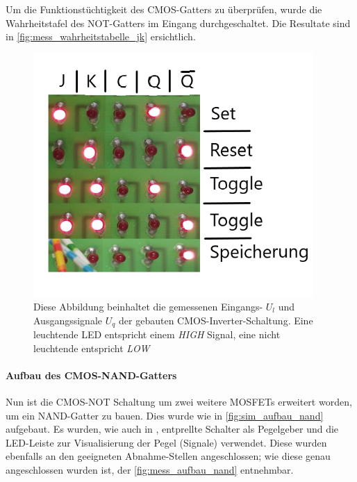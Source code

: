 \documentclass[12pt,english,ngerman]{scrartcl}
\begin{document}
Um die Funktionstüchtigkeit des CMOS-Gatters zu überprüfen, wurde die
Wahrheitstafel des NOT-Gatters im Eingang durchgeschaltet. Die Resultate
sind in \autoref{fig:mess_wahrheitstabelle_jk} ersichtlich.

\begin{figure}[H]
  \centering
    \includegraphics[width=0.95\textwidth]{./figures/messungen/jk/wahrheit.png}
  \caption{Diese Abbildung beinhaltet die gemessenen Eingangs- $U_l$ und
  Ausgangssignale $U_q$ der gebauten CMOS-Inverter-Schaltung. Eine leuchtende
  LED entspricht einem \textit{HIGH} Signal, eine nicht leuchtende entspricht
  \textit{LOW}} 
\label{fig:mess_wahrheitstabelle_jk}
\end{figure}


\paragraph{Aufbau des CMOS-NAND-Gatters}
Nun ist die CMOS-NOT Schaltung um zwei weitere MOSFETs erweitert worden, um ein
NAND-Gatter zu bauen. Dies wurde wie in \autoref{fig:sim_aufbau_nand} aufgebaut.
Es wurden, wie auch in , entprellte Schalter als
Pegelgeber und die LED-Leiste zur Visualisierung der Pegel (Signale) verwendet.
Diese wurden ebenfalls an den geeigneten Abnahme-Stellen angeschlossen; wie diese genau
angeschlossen wurden ist, der \autoref{fig:mess_aufbau_nand} entnehmbar.
\end{document}
